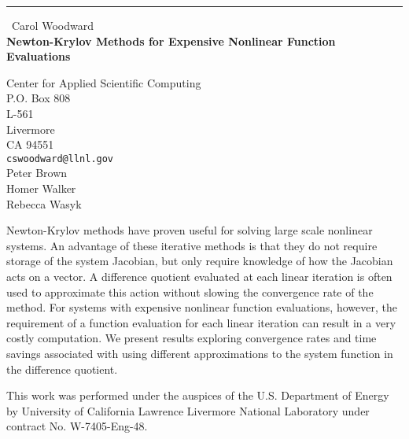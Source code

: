 \documentclass{report}
\begin{document}
\begin{center}
\rule{6in}{1pt} \
{\large Carol Woodward \\
{\bf Newton-Krylov Methods for Expensive Nonlinear Function Evaluations}}

Center for Applied Scientific Computing \\ P.O. Box 808 \\ L-561 \\ Livermore \\ CA  94551
\\
{\tt cswoodward@llnl.gov}\\
Peter Brown\\
Homer Walker\\
	Rebecca Wasyk\end{center}

Newton-Krylov methods have proven useful for solving large scale
nonlinear systems. An advantage of these iterative methods is that they
do not require storage of the system Jacobian, but only require knowledge
of how the Jacobian acts on a vector. A difference quotient evaluated at
each linear iteration is often used to approximate this action without
slowing the convergence rate of the method. For systems with expensive
nonlinear function evaluations, however, the requirement of a function
evaluation for each linear iteration can result in a very costly
computation. We present results exploring convergence rates and time
savings associated with using different approximations to the system
function in the difference quotient.

This work was performed under the auspices of the U.S. Department of
Energy by University of California Lawrence Livermore National Laboratory
under contract No. W-7405-Eng-48.
\end{document}
